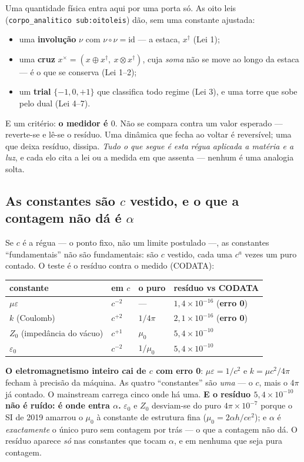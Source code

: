 \documentclass[11pt,a4paper]{article}
\newcommand{\code}[1]{\texttt{\small #1}}
\newcommand{\dg}{^{\dagger}}
\begin{document}
Uma quantidade física entra aqui por uma porta só. As oito leis (\code{corpo\_analitico sub:oitoleis}) dão,
sem uma constante ajustada:
\begin{itemize}\itemsep2pt
\item uma \textbf{involução} $\nu$ com $\nu\circ\nu=\mathrm{id}$ --- a estaca, $x\dg$ (Lei 1);
\item uma \textbf{cruz} $x^{\times}=(x\oplus x\dg,\ x\otimes x\dg)$, cuja \emph{soma} não se move ao longo
  da estaca --- é o que se conserva (Lei 1--2);
\item um \textbf{trial} $\{-1,0,+1\}$ que classifica todo regime (Lei 3), e uma torre que sobe pelo dual
  (Lei 4--7).
\end{itemize}
E um critério: \textbf{o medidor é $0$}. Não se compara contra um valor esperado --- reverte-se e lê-se o
resíduo. Uma dinâmica que fecha ao voltar é reversível; uma que deixa resíduo, dissipa. \emph{Tudo o que
segue é esta régua aplicada a matéria e a luz}, e cada elo cita a lei ou a medida em que assenta ---
nenhum é uma analogia solta.

\subsection*{As constantes são $c$ vestido, e o que a contagem não dá é $\alpha$}

Se $c$ é a régua --- o ponto fixo, não um limite postulado ---, as constantes ``fundamentais'' não são
fundamentais: são $c$ vestido, cada uma $c^{a}$ vezes um puro contado. O teste é o resíduo contra o medido
(CODATA):

\begin{center}\small
\begin{tabular}{@{}llll@{}}
\toprule
constante & em $c$ & o puro & resíduo vs CODATA \\
\midrule
$\mu\varepsilon$ & $c^{-2}$ & --- & $1{,}4\times10^{-16}$ (\textbf{erro 0}) \\
$k$ (Coulomb) & $c^{+2}$ & $1/4\pi$ & $2{,}1\times10^{-16}$ (\textbf{erro 0}) \\
$Z_0$ (impedância do vácuo) & $c^{+1}$ & $\mu_0$ & $5{,}4\times10^{-10}$ \\
$\varepsilon_0$ & $c^{-2}$ & $1/\mu_0$ & $5{,}4\times10^{-10}$ \\
\bottomrule
\end{tabular}
\end{center}

\noindent \textbf{O eletromagnetismo inteiro cai de $c$ com erro 0}: $\mu\varepsilon=1/c^2$ e
$k=\mu c^2/4\pi$ fecham à precisão da máquina. As quatro ``constantes'' são \emph{uma} --- o $c$, mais o
$4\pi$ já contado. O mainstream carrega cinco onde há uma. \textbf{E o resíduo $5{,}4\times10^{-10}$ não é
ruído: é onde entra $\alpha$.} $\varepsilon_0$ e $Z_0$ desviam-se do puro $4\pi\times10^{-7}$ porque o SI de
2019 amarrou o $\mu_0$ à constante de estrutura fina ($\mu_0=2\alpha h/ce^2$); e $\alpha$ é \emph{exactamente}
o único puro sem contagem por trás --- o que a contagem não dá. O resíduo aparece \emph{só} nas constantes que
tocam $\alpha$, e em nenhuma que seja pura contagem.
\end{document}
